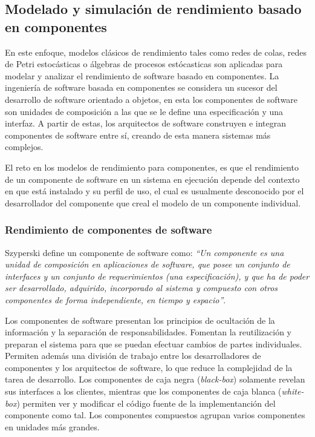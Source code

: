 \subsection{Modelado y simulación de rendimiento basado en componentes}
En este enfoque, modelos clásicos de rendimiento tales como redes de colas, redes de Petri estocásticas o álgebras de procesos estócasticas son aplicadas para modelar y analizar el rendimiento de software basado en componentes. La ingeniería de software basada en componentes se considera un sucesor del desarrollo de software orientado a objetos, en esta los componentes de software son unidades de composición a las que se le define una especificación y una interfaz. A partir de estas, los arquitectos de software construyen e integran componentes de software entre sí, creando de esta manera sistemas más complejos.\cite{Koziolek:2010:PEC:1808359.1808729}

El reto en los modelos de rendimiento para componentes, es que el rendimiento de un componente de software en un sistema en ejecución depende del contexto en que está instalado y su perfil de uso, el cual es usualmente desconocido por el desarrollador del componente que creal el modelo de un componente individual.

\subsubsection{Rendimiento de componentes de software}
Szyperski\cite{Szyperski:2002:CSB:515228} define un componente de software como: \textit{``Un componente es una unidad de composición en aplicaciones de software, que posee un conjunto de interfaces y un conjunto de requerimientos (una especificación), y que ha de poder ser desarrollado, adquirido, incorporado al sistema y compuesto con otros componentes de forma independiente, en tiempo y espacio''}. 

Los componentes de software presentan los principios de ocultación de la información y la separación de responsabilidades. Fomentan la reutilización y preparan el sistema para que se puedan efectuar cambios de partes individuales. Permiten además una división de trabajo entre los desarrolladores de componentes y los arquitectos de software, lo que reduce la complejidad de la tarea de desarrollo. Los componentes de caja negra (\emph{black-box}) solamente revelan sus interfaces a los clientes, mientras que los componentes de caja blanca (\emph{white-box}) permiten ver y modificar el código fuente de la implementanción del componente como tal. Los componentes compuestos agrupan varios componentes en unidades más grandes.

